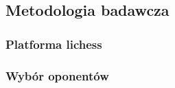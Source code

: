 \subsection{Metodologia badawcza}
\label{subsec:metodologia-badawcza}

\subsubsection{Platforma lichess}
\subsubsection{Wybór oponentów}